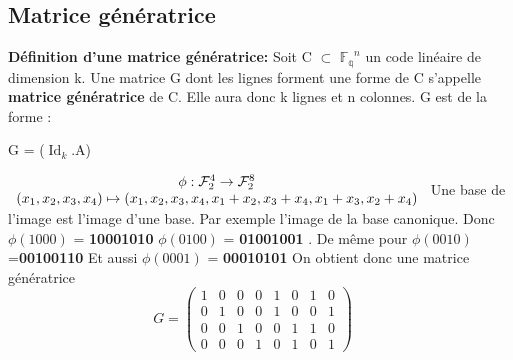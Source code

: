 \documentclass[french,nochapter,11pt]{rapportUB}
\begin{document}
\subsection{Matrice génératrice}
\textbf{Définition d'une matrice génératrice:} Soit C $\subset$ $\mathbb{F_q}^n$ un code linéaire de dimension k. Une matrice G dont les lignes forment une forme de C s'appelle \textbf{matrice génératrice} de C. Elle aura donc k lignes et n colonnes.\vspace{0.3cm}\newline
G est de la forme :
\begin{center}
  G = ($\operatorname{Id}_{k}$.A)
\end{center}
 
$\begin{array}{cccc}
  \phi :  \mathcal{F}_2^4 \to  \mathcal{F}_2^8 \cr
(x_1,x_2,x_3,x_4) \mapsto (x_1,x_2,x_3,x_4,x_1+x_2,x_3+x_4,x_1+x_3,x_2+x_4)
\end{array}$
\newline
Une base de l'image est l'image d'une base. Par exemple l'image de la base  canonique. \newline
Donc $\phi(1000)$ = \textbf{10001010} \newline
$\phi(0100)$ = \textbf{01001001} . \newline
De même pour $\phi(0010)$=\textbf{00100110} \newline
Et aussi $\phi(0001)$ = \textbf{00010101} \newline
On obtient donc une matrice génératrice
$$G=
\begin{pmatrix}
  1 & 0 & 0 & 0 & 1 & 0 & 1 & 0  \\
  0 & 1 & 0 & 0 & 1 & 0 & 0 & 1  \\
  0 & 0 & 1 & 0 & 0 & 1 & 1 & 0  \\
  0 & 0 & 0 & 1 & 0 & 1 & 0 & 1 
  
  
\end{pmatrix}
\quad
$$
\clearpage
\end{document}
